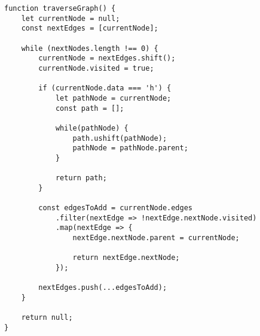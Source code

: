 \documentclass[../article.tex]{subfiles}
\begin{document}
\begin{figure*}
    \begin{ruledelement}
        \begin{lstlisting}[caption={Поиск пути при обходе взвешенного графа в ширину}, label={lst:bfsWeightedRandomPath}]
function traverseGraph() {
    let currentNode = null;
    const nextEdges = [currentNode];

    while (nextNodes.length !== 0) {
        currentNode = nextEdges.shift();
        currentNode.visited = true;

        if (currentNode.data === 'h') {
            let pathNode = currentNode;
            const path = [];

            while(pathNode) {
                path.ushift(pathNode);
                pathNode = pathNode.parent;
            }

            return path;
        }

        const edgesToAdd = currentNode.edges
            .filter(nextEdge => !nextEdge.nextNode.visited)
            .map(nextEdge => {
                nextEdge.nextNode.parent = currentNode;

                return nextEdge.nextNode;
            });

        nextEdges.push(...edgesToAdd);
    }

    return null;
}
        \end{lstlisting}
    \end{ruledelement}

\end{figure*}
\end{document}
